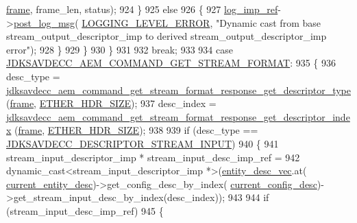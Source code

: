 \begin{DoxyCode}
{{      \hyperlink{gst__avb__playbin_8c_ac8e710e0b5e994c0545d75d69868c6f0}{frame}, frame\_len, status);
924             \}
925             \textcolor{keywordflow}{else}
926             \{
927                 \hyperlink{namespaceavdecc__lib_acbe3e2a96ae6524943ca532c87a28529}{log\_imp\_ref}->\hyperlink{classavdecc__lib_1_1log_a68139a6297697e4ccebf36ccfd02e44a}{post\_log\_msg}(
      \hyperlink{namespaceavdecc__lib_a501055c431e6872ef46f252ad13f85cdaf2c4481208273451a6f5c7bb9770ec8a}{LOGGING\_LEVEL\_ERROR}, \textcolor{stringliteral}{"Dynamic cast from base stream\_output\_descriptor\_imp to derived
       stream\_output\_descriptor\_imp error"});
928             \}
929         \}
930     \}
931 
932     \textcolor{keywordflow}{break};
933 
934     \textcolor{keywordflow}{case} \hyperlink{group__command_ga44127c37d4df5fa78a40d28e053ac62c}{JDKSAVDECC\_AEM\_COMMAND\_GET\_STREAM\_FORMAT}:
935     \{
936         desc\_type = 
      \hyperlink{group__command__get__stream__format__response_ga241be5e90082adf05f17e1139bc77bc4}{jdksavdecc\_aem\_command\_get\_stream\_format\_response\_get\_descriptor\_type}
      (\hyperlink{gst__avb__playbin_8c_ac8e710e0b5e994c0545d75d69868c6f0}{frame}, \hyperlink{namespaceavdecc__lib_a6c827b1a0d973e18119c5e3da518e65ca9512ad9b34302ba7048d88197e0a2dc0}{ETHER\_HDR\_SIZE});
937         desc\_index = 
      \hyperlink{group__command__get__stream__format__response_ga7563eab7dd358577f64f660404bed6c9}{jdksavdecc\_aem\_command\_get\_stream\_format\_response\_get\_descriptor\_index}
      (\hyperlink{gst__avb__playbin_8c_ac8e710e0b5e994c0545d75d69868c6f0}{frame}, \hyperlink{namespaceavdecc__lib_a6c827b1a0d973e18119c5e3da518e65ca9512ad9b34302ba7048d88197e0a2dc0}{ETHER\_HDR\_SIZE});
938 
939         \textcolor{keywordflow}{if} (desc\_type == \hyperlink{group__descriptor_ga4eb0b7597f11b5fc36f3625acd82e503}{JDKSAVDECC\_DESCRIPTOR\_STREAM\_INPUT})
940         \{
941             stream\_input\_descriptor\_imp * stream\_input\_desc\_imp\_ref =
942                 \textcolor{keyword}{dynamic\_cast<}stream\_input\_descriptor\_imp *\textcolor{keyword}{>}(\hyperlink{classavdecc__lib_1_1end__station__imp_a72edab41bc56e3c1757944a7df188a3d}{entity\_desc\_vec}.at(
      \hyperlink{classavdecc__lib_1_1end__station__imp_afd78c89df26ba7641e1adb764c0e827d}{current\_entity\_desc})->get\_config\_desc\_by\_index(
      \hyperlink{classavdecc__lib_1_1end__station__imp_a60b1af40d35e8a86b0082c54ab6cb6a8}{current\_config\_desc})->get\_stream\_input\_desc\_by\_index(desc\_index));
943 
944             \textcolor{keywordflow}{if} (stream\_input\_desc\_imp\_ref)
945             \{
}}
\end{DoxyCode}
